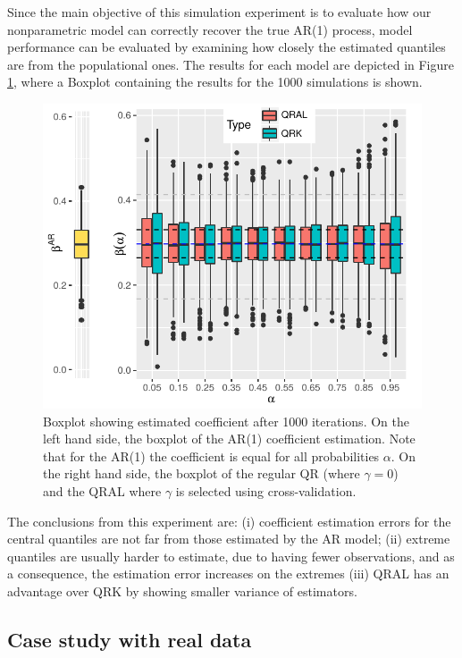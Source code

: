 Since the main objective of this simulation experiment is to evaluate how our nonparametric model can correctly recover the true AR(1) process, model performance can be evaluated by examining how closely the estimated quantiles are from the populational ones. The results for each model are depicted in Figure \ref{fig:boxplot-ar1}, where a Boxplot containing the results for the 1000 simulations is shown. %
\begin{figure}[ht]
	\centering
	\includegraphics[width=1.0\linewidth]{Images/boxplot-ar1.pdf}
	\caption{Boxplot showing estimated coefficient after 1000 iterations. On the left hand side, the boxplot of the AR(1) coefficient estimation. Note that for the AR(1) the coefficient is equal for all probabilities $\alpha$. On the right hand side, the boxplot of the regular QR (where $\gamma = 0$) and the QRAL where $\gamma$ is selected using cross-validation. }
	\label{fig:boxplot-ar1}
\end{figure}
The conclusions from this experiment are: (i) coefficient estimation errors for the central quantiles are not far from those estimated by the AR model; (ii) extreme quantiles are usually harder to estimate, due to having fewer observations, and as a consequence, the estimation error increases on the extremes (iii) QRAL has an advantage over QRK by showing smaller variance of estimators.


\subsection{Case study with real data}

